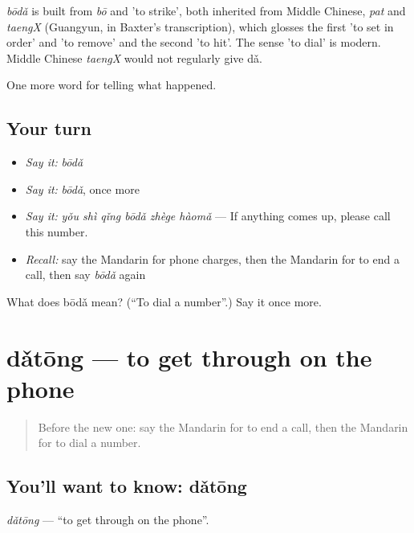 \begin{cousinweb}
\emph{bōdǎ} is built from \emph{bō} and  'to strike', both inherited from Middle Chinese, \emph{pat} and \emph{taengX} (Guangyun, in Baxter's transcription), which glosses the first 'to set in order' and 'to remove' and the second 'to hit'. The sense 'to dial' is modern. Middle Chinese \emph{taengX} would not regularly give dǎ.
\end{cousinweb}

\begin{grammarlens}[title={What you've built}]
One more word for telling what happened.
\end{grammarlens}

\subsection*{Your turn}
\begin{itemize}
\raggedright
  \item \emph{Say it:} \emph{bōdǎ}
  \item \emph{Say it:} \emph{bōdǎ}, once more
  \item \emph{Say it:} \emph{yǒu shì qǐng bōdǎ zhège hàomǎ} — If anything comes up, please call this number.
  \item \emph{Recall:} say the Mandarin for phone charges, then the Mandarin for to end a call, then say \emph{bōdǎ} again
\end{itemize}

\begin{tcolorbox}[breakable,colback=teal!4,colframe=teal!35!black,title={Before you move on}]
What does bōdǎ mean? (\textquotedblleft{}To dial a number\textquotedblright{}.) Say it once more.
\end{tcolorbox}
\section[dǎtōng]{dǎtōng — to get through on the phone}

\label{lesson:ZH-C320-datong}



\begin{quote}
Before the new one: say the Mandarin for to end a call, then the Mandarin for to dial a number.
\end{quote}

\subsection*{You'll want to know: dǎtōng}
\emph{dǎtōng} — \textquotedblleft{}to get through on the phone\textquotedblright{}.


